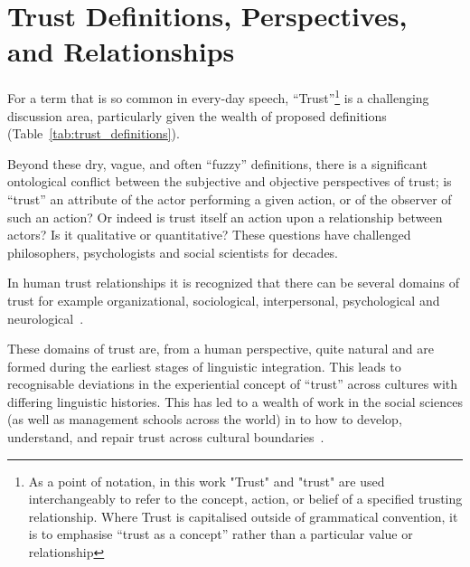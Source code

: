 \section{Trust Definitions, Perspectives, and Relationships}\label{sec:trust_defs}
For a term that is so common in every-day speech, ``Trust''\footnote{As a point of notation, in this work "Trust" and "trust" are used interchangeably to refer to the concept, action, or belief of a specified trusting relationship. Where Trust is capitalised outside of grammatical convention, it is to emphasise ``trust as a concept'' rather than a particular value or relationship} is a challenging discussion area, particularly given the wealth of proposed definitions (Table~\ref{tab:trust_definitions}).

Beyond these dry, vague, and often ``fuzzy'' definitions, there is a significant ontological conflict between the subjective and objective perspectives of trust; is ``trust'' an attribute of the actor performing a given action, or of the observer of such an action? Or indeed is trust itself an action upon a relationship between actors? Is it qualitative or quantitative? These questions have challenged philosophers, psychologists and social scientists for decades.

In human trust relationships it is recognized that there can be several domains of trust for example organizational, sociological, interpersonal, psychological and neurological~\cite{Lee2004}.

These domains of trust are, from a human perspective, quite natural and are formed during the earliest stages of linguistic integration.
This leads to recognisable deviations in the experiential concept of ``trust'' across cultures with differing linguistic histories.
This has led to a wealth of work in the social sciences (as well as management schools across the world) in to how to develop, understand, and repair trust across cultural boundaries~\cite{Okumura2011}.

